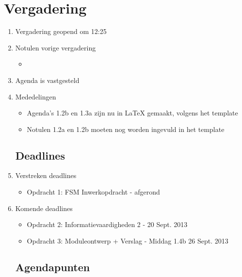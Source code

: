 \documentclass{article}
\begin{document}
\section*{Vergadering}
\begin{enumerate}
	
	\subsection*{Vooraf}
	\item Vergadering geopend om 12:25%
	\item Notulen vorige vergadering
	\begin{itemize}
		\item
	\end{itemize}

	\item Agenda is vastgesteld
	\item Mededelingen
	\begin{itemize}
		\item Agenda's 1.2b en 1.3a zijn nu in LaTeX gemaakt, volgens het template
		\item Notulen 1.2a en 1.2b moeten nog worden ingevuld in het template
	\end{itemize}

	\subsection*{Deadlines}
	\item Verstreken deadlines
	\begin{itemize}
		\item
		Opdracht 1: FSM Inwerkopdracht - afgerond
	\end{itemize}
	\item Komende deadlines
	\begin{itemize}
		\item	Opdracht 2: Informatievaardigheden 2 - 20 Sept. 2013
		\item	Opdracht 3: Moduleontwerp + Verslag  -  Middag 1.4b 26 Sept. 2013
	\end{itemize}

	\subsection*{Agendapunten}
	


\end{enumerate}
\end{document}
